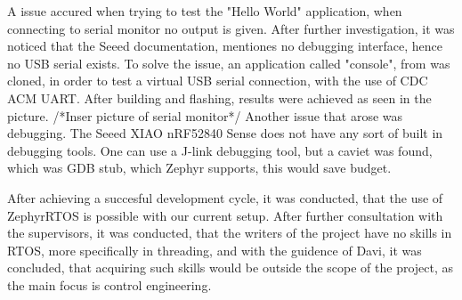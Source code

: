 \documentclass[a4paper,11pt]{article}
\begin{document}
A issue accured when trying to test the "Hello World" application, when connecting to serial monitor no output is given.
After further investigation, it was noticed that the Seeed documentation, mentiones no debugging interface, hence no USB serial exists.
To solve the issue, an application called "console", from  was cloned, in order to test a virtual USB serial connection, with the use of CDC ACM UART. \cite{gitZephyr}
After building and flashing, results were achieved as seen in the picture.
/*Inser picture of serial monitor*/
Another issue that arose was debugging. The Seeed XIAO nRF52840 Sense does not have any sort of built in debugging tools. \cite{wikiSeeed} 
One can use a J-link debugging tool, but a caviet was found, which was GDB stub, which Zephyr supports, this would save budget. \cite{docsZephyr}

After achieving a succesful development cycle, it was conducted, that the use of ZephyrRTOS is possible with our current setup.
After further consultation with the supervisors, it was conducted, that the writers of the project have no skills in RTOS, more specifically in threading, and with the guidence of Davi, it was concluded, that acquiring such skills would be outside the scope of the project, as the main focus is control engineering.



\end{document}

